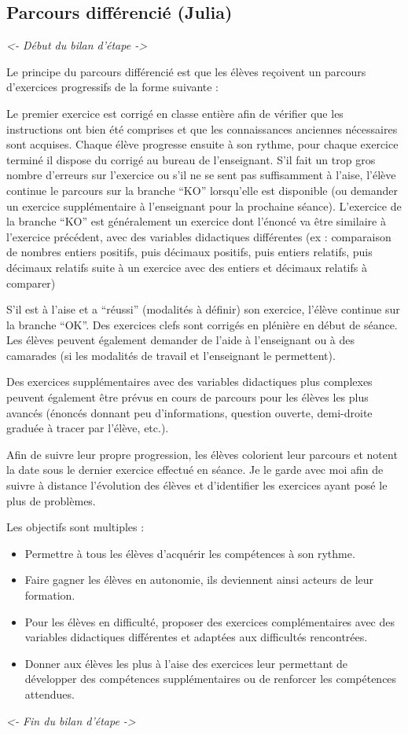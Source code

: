 \subsection{Parcours différencié (Julia)}

\textit{<- Début du bilan d'étape ->}

Le principe du parcours différencié est que les élèves reçoivent un parcours d’exercices progressifs de la forme suivante :

Le premier exercice est corrigé en classe entière afin de vérifier que les instructions ont bien été comprises et que les connaissances anciennes nécessaires sont acquises. Chaque élève progresse ensuite à son rythme, pour chaque exercice terminé il dispose du corrigé au bureau de l’enseignant. S’il fait un trop gros nombre d’erreurs sur l’exercice ou s’il ne se sent pas suffisamment à l’aise, l’élève continue le parcours sur la branche “KO” lorsqu’elle est disponible (ou demander un exercice supplémentaire à l’enseignant pour la prochaine séance). L’exercice de la branche “KO” est généralement un exercice dont l’énoncé va être similaire à l’exercice précédent, avec des variables didactiques différentes (ex : comparaison de nombres entiers positifs, puis décimaux positifs, puis entiers relatifs, puis décimaux relatifs suite à un exercice avec des entiers et décimaux relatifs à comparer)

S’il est à l’aise et a “réussi” (modalités à définir) son exercice, l’élève continue sur la branche “OK”. Des exercices clefs sont corrigés en plénière en début de séance. Les élèves peuvent également demander de l’aide à l’enseignant ou à des camarades (si les modalités de travail et l’enseignant le permettent).

Des exercices supplémentaires avec des variables didactiques plus complexes peuvent également être prévus en cours de parcours pour les élèves les plus avancés (énoncés donnant peu d’informations, question ouverte, demi-droite graduée à tracer par l’élève, etc.).

Afin de suivre leur propre progression, les élèves colorient leur parcours et notent la date sous le dernier exercice effectué en séance. Je le garde avec moi afin de suivre à distance l’évolution des élèves et d’identifier les exercices ayant posé le plus de problèmes.

Les objectifs sont multiples : 
\begin{itemize}
    \item Permettre à tous les élèves d’acquérir les compétences à son rythme.
    \item Faire gagner les élèves en autonomie, ils deviennent ainsi acteurs de leur formation. 
    \item Pour les élèves en difficulté, proposer des exercices complémentaires avec des variables didactiques différentes et adaptées aux difficultés rencontrées.
    \item Donner aux élèves les plus à l’aise des exercices leur permettant de développer des compétences supplémentaires ou de renforcer les compétences attendues.
\end{itemize}

\textit{<- Fin du bilan d'étape ->}